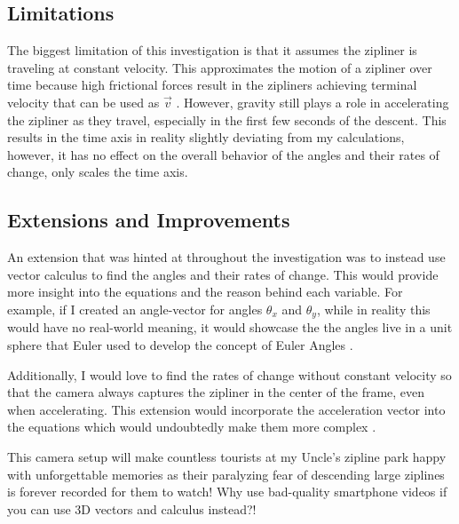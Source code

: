 \documentclass[12pt]{article}
\begin{document}
\subsection{Limitations}
The biggest limitation of this investigation is that it assumes the zipliner is traveling at constant velocity. This approximates the motion of a zipliner over time because high frictional forces result in the zipliners achieving terminal velocity that can be used as $\vec v$ \autocite{terminal}. However, gravity still plays a role in accelerating the zipliner as they travel, especially in the first few seconds of the descent. This results in the time axis in reality slightly deviating from my calculations, however, it has no effect on the overall behavior of the angles and their rates of change, only scales the time axis. 


\subsection{Extensions and Improvements}
An extension that was hinted at throughout the investigation was to instead use vector calculus to find the angles and their rates of change. This would provide more insight into the equations and the reason behind each variable. For example, if I created an angle-vector for angles $\theta_x$ and $\theta_y$, while in reality this would have no real-world meaning, it would showcase the the angles live in a unit sphere that Euler used to develop the concept of Euler Angles \autocite{euler}. 

Additionally, I would love to find the rates of change without constant velocity so that the camera always captures the zipliner in the center of the frame, even when accelerating. This extension would incorporate the acceleration vector into the equations which would undoubtedly make them more complex \autocite{acceleration}. 

\vspace{30pt}

This camera setup will make countless tourists at my Uncle's zipline park happy with unforgettable memories as their paralyzing fear of descending large ziplines is forever recorded for them to watch! Why use bad-quality smartphone videos if you can use 3D vectors and calculus instead?!

\newpage
\printbibliography
\end{document}
